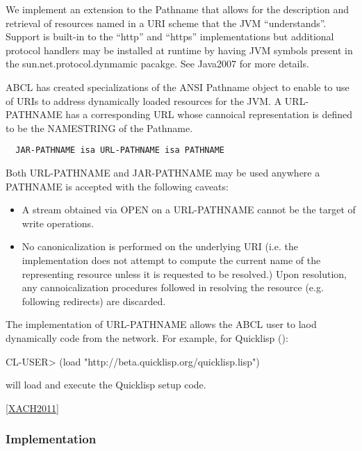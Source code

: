 \documentclass[10pt]{book}
\begin{document}
We implement an extension to the Pathname that allows for the
description and retrieval of resources named in a URI scheme that the
JVM ``understands''.  Support is built-in to the ``http'' and
``https'' implementations but additional protocol handlers may be
installed at runtime by having JVM symbols present in the
sun.net.protocol.dynmamic pacakge. See Java2007 \cite{Java2007} for more
details.

ABCL has created specializations of the ANSI Pathname object to
enable to use of URIs to address dynamically loaded resources for the
JVM.  A URL-PATHNAME has a corresponding URL whose cannoical
representation is defined to be the NAMESTRING of the Pathname.

\begin{verbatim}
  JAR-PATHNAME isa URL-PATHNAME isa PATHNAME
\end{verbatim}

Both URL-PATHNAME and JAR-PATHNAME may be used anywhere a PATHNAME is
accepted with the following caveats:

\begin{itemize}

\item A stream obtained via OPEN on a URL-PATHNAME cannot be the
  target of write operations.

\item No canonicalization is performed on the underlying URI (i.e. the
implementation does not attempt to compute the current name of the
representing resource unless it is requested to be resolved.)  Upon
resolution, any cannoicalization procedures followed in resolving the
resource (e.g. following redirects) are discarded.  

\end{itemize}

The implementation of URL-PATHNAME allows the ABCL user to laod dynamically
code from the network.  For example, for Quicklisp (\cite{Xach2011}):

\begin{listing-lisp}
  CL-USER> (load "http://beta.quicklisp.org/quicklisp.lisp")
\end{listing-lisp}

will load and execute the Quicklisp setup code.

\ref{XACH2011}

\subsubsection{Implementation}
\end{document}
